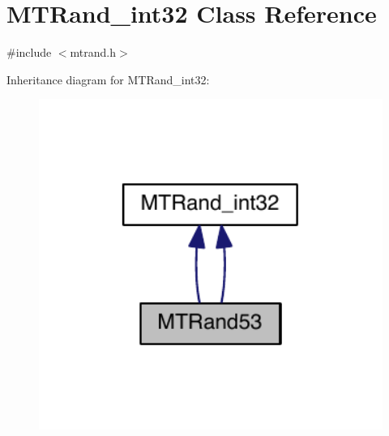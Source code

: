 \hypertarget{a00019}{\section{M\-T\-Rand\-\_\-int32 Class Reference}
\label{a00019}
}


{\ttfamily \#include $<$mtrand.\-h$>$}



Inheritance diagram for M\-T\-Rand\-\_\-int32\-:
\nopagebreak
\begin{figure}[H]
\begin{center}
\leavevmode
\includegraphics[width=350pt]{a00219}
\end{center}
\end{figure}
